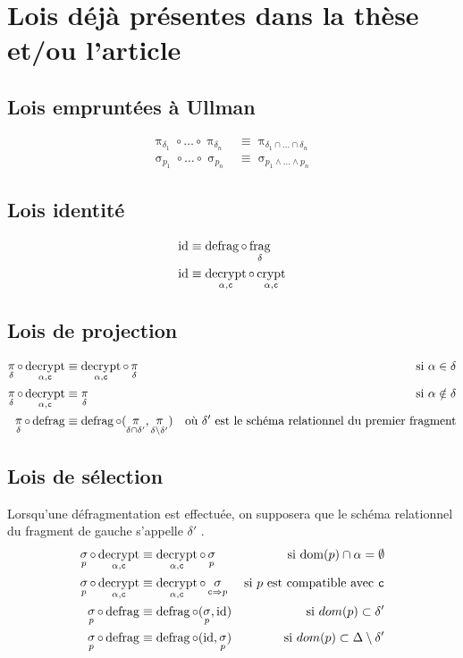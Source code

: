 \documentclass[french]{article}
\DeclareMathOperator{\proj}{\pi}
\DeclareMathOperator{\sel}{\sigma}
\DeclareMathOperator{\frag}{frag}
\DeclareMathOperator{\defrag}{defrag}
\DeclareMathOperator{\crypt}{crypt}
\DeclareMathOperator{\decrypt}{decrypt}
\DeclareMathOperator{\id}{id}
\DeclareMathOperator{\dom}{dom}
\newcommand\typeT[1]{\text{\ttfamily #1}}
\newcommand{\decryptArgs}[2]{\decrypt_{#1 , \typeT{#2}}}
\newcommand{\cryptArgs}[2]{\crypt_{#1 , \typeT{#2}}}
\newcommand{\projDelta}{\proj_{\delta}}
\newcommand{\selP}{\sel_p}
\newcommand{\decryptCAlpha}{\decryptArgs{\alpha}{c}}
\newcommand{\fragDelta}{\frag_{\delta}}
\begin{document}
\section*{Lois déjà présentes dans la thèse et/ou l'article}
\subsection*{Lois empruntées à Ullman}
\begin{align}
	\proj_{\delta_1}\circ \dots \circ \proj_{\delta_n} 
	&\equiv \proj_{\delta_1 \cap \dots \cap \delta_n} \\
	\sel_{p_1} \circ \dots \circ \sel_{p_n}
	&\equiv \sel_{p_1 \wedge \dots \wedge p_n}
\end{align}
\subsection*{Lois identité}
\begin{align}
	\id & \equiv \defrag \circ \fragDelta \\
	\id & \equiv \decryptArgs{\alpha}{c} \circ \cryptArgs{\alpha}{c}
\end{align}

\subsection*{Lois de projection}
\begin{align}
\projDelta \circ \decryptArgs{\alpha}{c}
& \equiv \decryptArgs{\alpha}{c} \circ \projDelta
&\text{si $\alpha \in \delta$}\\
\projDelta \circ \decryptArgs{\alpha}{c}
& \equiv \projDelta
&\text{si $\alpha \notin \delta$} \\
\projDelta \circ \defrag
& \equiv \defrag \circ (\proj_{\delta \cap \delta'}, \proj_{\delta \setminus \delta'})
& \text{où $\delta'$ est le schéma relationnel du premier fragment}
\end{align}

\subsection*{Lois de sélection}
Lorsqu'une défragmentation est effectuée, on supposera que le schéma relationnel
du fragment de gauche s'appelle $\delta'$ .
\begin{align}
\selP \circ \decryptCAlpha 
& \equiv \decryptCAlpha \circ \selP
& \text{si $\dom(p) \cap \alpha = \emptyset$} \\
\selP \circ \decryptCAlpha 
& \equiv \decryptCAlpha \circ \sel_{\typeT{c} \Rightarrow p}
& \text{si $p$  est compatible avec $\typeT{c}$} \\
\selP \circ \defrag 
& \equiv \defrag \circ (\selP, \id)
& \text{si $dom(p) \subset \delta'$} \\
\selP \circ \defrag 
& \equiv \defrag \circ (\id, \selP)
& \text{si $dom(p) \subset \Delta \setminus \delta'$}
\end{align}
 
\end{document}

